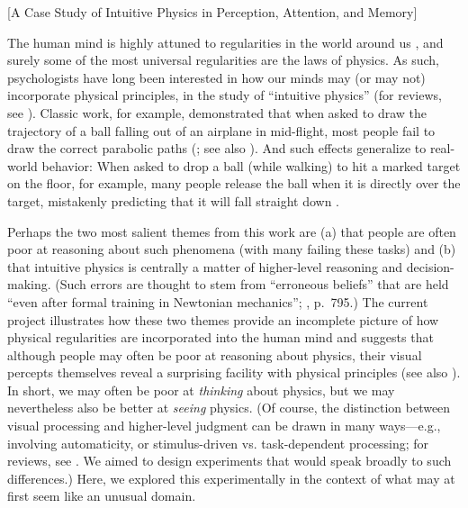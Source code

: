 [A Case Study of Intuitive Physics in Perception, Attention, and Memory]
\label{chap:PsychSci2023}


The human mind is highly attuned to regularities in the world around us \parencite{shepard_perceptual-cognitive_1994}, and surely some of the most universal regularities are the laws of physics. As such, psychologists have long been interested in how our minds may (or may not) incorporate physical principles, in the study of “intuitive physics” (for reviews, see \cite{kubricht_intuitive_2017, ullman_mind_2017}). Classic work, for example, demonstrated that when asked to draw the trajectory of a ball falling out of an airplane in mid-flight, most people fail to draw the correct parabolic paths (\cite{mccloskey_etal_1983}; see also \cite{mccloskey_curvilinear_1980}). And such effects generalize to real-world behavior: When asked to drop a ball (while walking) to hit a marked target on the floor, for example, many people release the ball when it is directly over the target, mistakenly predicting that it will fall straight down \parencite{mccloskey_alone_1983}.

Perhaps the two most salient themes from this work are (a) that people are often poor at reasoning about such phenomena (with many failing these tasks) and (b) that intuitive physics is centrally a matter of higher-level reasoning and decision-making. (Such errors are thought to stem from “erroneous beliefs” that are held “even after formal training in Newtonian mechanics”; \cite{kaiser_judgments_1985}, p.~795.)
The current project illustrates how these two themes provide an incomplete picture of how physical regularities are incorporated into the human mind and suggests that although people may often be poor at reasoning about physics, their visual percepts themselves reveal a surprising facility with physical principles (see also \cite{firestone_seeing_2017}). In short, we may often be poor at \textit{thinking} about physics, but we may nevertheless also be better at \textit{seeing} physics. (Of course, the distinction between visual processing and higher-level judgment can be drawn in many ways---e.g., involving automaticity, or stimulus-driven vs. task-dependent processing; for reviews, see \cite{block_border_2023, firestone_cognition_2016}. We aimed to design experiments that would speak broadly to such differences.) Here, we explored this experimentally in the context of what may at first seem like an unusual domain.

